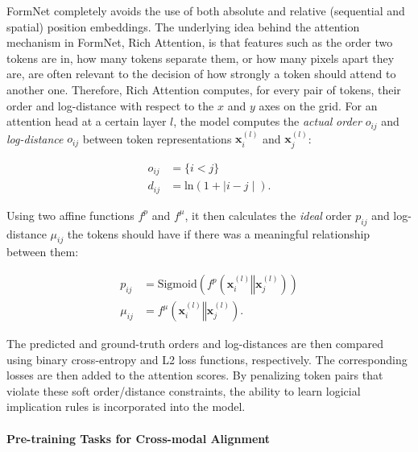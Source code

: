 FormNet \citep{lee2022formnet} completely avoids the use of both absolute and relative (sequential and spatial) position embeddings. The underlying idea behind the attention mechanism in FormNet, Rich Attention, is that features such as the order two tokens are in, how many tokens separate them, or how many pixels apart they are, are often relevant to the decision of how strongly a token should attend to another one. Therefore, Rich Attention computes, for every pair of tokens, their order and log-distance with respect to the $x$ and $y$ axes on the grid. For an attention head at a certain layer $l$, the model computes the \textit{actual} \textit{order} $o_{ij}$ and \textit{log-distance} $o_{ij}$ between token representations $\bm{x}^{(l)}_i$ and $\bm{x}^{(l)}_j$:

\begin{align}
    o_{ij} &= \{i < j\} \\
    d_{ij} &= \text{ln}(1 + \mid i - j \mid).
\end{align}

\noindent Using two affine functions $f^p$ and $f^{\mu}$, it then calculates the \textit{ideal} order $p_{ij}$ and log-distance $\mu_{ij}$ the tokens should have if there was a meaningful relationship between them:

\begin{align}
    p_{ij} &= \text{Sigmoid}\left(f^p(\bm{x}^{(l)}_i \mathbin\Vert \bm{x}^{(l)}_j)\right)\\
    \mu_{ij} &= f^{\mu}(\bm{x}^{(l)}_i \mathbin\Vert \bm{x}^{(l)}_j).
\end{align}

\noindent The predicted and ground-truth orders and log-distances are then compared using binary cross-entropy and L2 loss functions, respectively. The corresponding losses are then added to the attention scores. By penalizing token pairs that violate these soft order/distance constraints, the ability to learn logicial implication rules is incorporated into the model.


\paragraph{Pre-training Tasks for Cross-modal Alignment}

